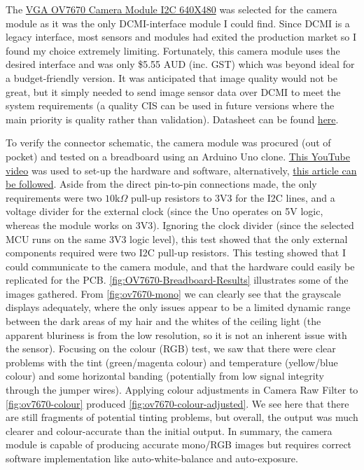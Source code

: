 The \href{https://core-electronics.com.au/vga-ov7670-camera-module-i2c-640x480.html}{VGA OV7670 Camera Module I2C 640X480} was selected for the camera module as it was the only DCMI-interface module I could find. Since DCMI is a legacy interface, most sensors and modules had exited the production market so I found my choice extremely limiting. Fortunately, this camera module uses the desired interface and was only \$5.55 AUD (inc. GST) which was beyond ideal for a budget-friendly version. It was anticipated that image quality would not be great, but it simply needed to send image sensor data over DCMI to meet the system requirements (a quality CIS can be used in future versions where the main priority is quality rather than validation). Datasheet can be found \href{https://web.mit.edu/6.111/www/f2016/tools/OV7670_2006.pdf}{here}.

\label{sec:v1-sensor-breadboard}

To verify the connector schematic, the camera module was procured (out of pocket) and tested on a breadboard using an Arduino Uno clone. \href{https://www.youtube.com/watch?v=R94WZH8XAvM}{This YouTube video} was used to set-up the hardware and software, alternatively, \href{https://circuitjournal.com/arduino-OV7670-to-pc}{this article can be followed}. Aside from the direct pin-to-pin connections made, the only requirements were two $10$k$\Omega$ pull-up resistors to 3V3 for the I2C lines, and a voltage divider for the external clock (since the Uno operates on 5V logic, whereas the module works on 3V3). Ignoring the clock divider (since the selected MCU runs on the same 3V3 logic level), this test showed that the only external components required were two I2C pull-up resistors.
\nl
This testing showed that I could communicate to the camera module, and that the hardware could easily be replicated for the PCB. \autoref{fig:OV7670-Breadboard-Results} illustrates some of the images gathered. From \autoref{fig:ov7670-mono} we can clearly see that the grayscale displays adequately, where the only issues appear to be a limited dynamic range between the dark areas of my hair and the whites of the ceiling light (the apparent bluriness is from the low resolution, so it is not an inherent issue with the sensor). Focusing on the colour (RGB) test, we saw that there were clear problems with the tint (green/magenta colour) and temperature (yellow/blue colour) and some horizontal banding (potentially from low signal integrity through the jumper wires). Applying colour adjustments in Camera Raw Filter to \autoref{fig:ov7670-colour} produced \autoref{fig:ov7670-colour-adjusted}. We see here that there are still fragments of potential tinting problems, but overall, the output was much clearer and colour-accurate than the initial output. In summary, the camera module is capable of producing accurate mono/RGB images but requires correct software implementation like auto-white-balance and auto-exposure.

